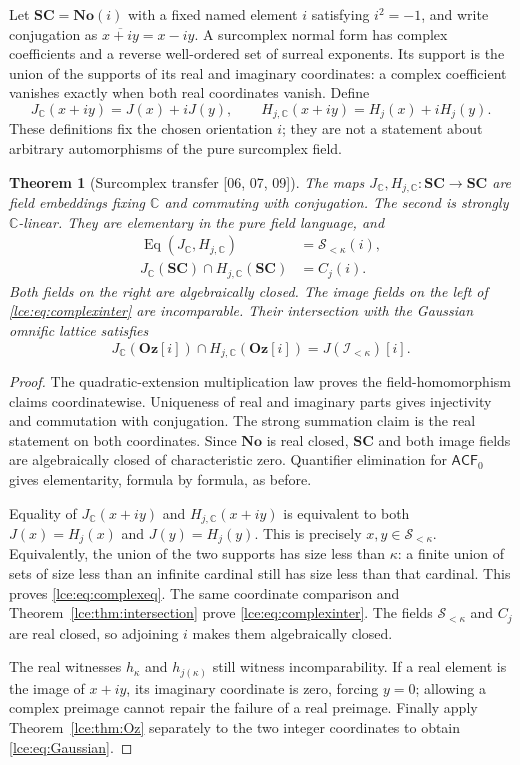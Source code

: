 \documentclass[11pt,letterpaper]{article}
\numberwithin{equation}{section}
\newtheorem{theorem}{Theorem}[section]
\theoremstyle{definition}
\theoremstyle{remark}
\newcommand{\No}{\mathbf{No}}
\newcommand{\Oz}{\mathbf{Oz}}
\newcommand{\SC}{\mathbf{SC}}
\newcommand{\C}{\mathbb C}
\newcommand{\Sk}{\mathscr S_{<\kappa}}
\newcommand{\Ik}{\mathscr I_{<\kappa}}
\newcommand{\Common}{C_j}
\newcommand{\Jc}{J_{\C}}
\newcommand{\Hc}{H_{j,\C}}
\newcommand{\ACF}{\mathsf{ACF}_0}
\newcommand{\thref}[1]{Theorem~\ref{#1}}
\newcommand{\src}[1]{\textup{\textsf{\small[#1]}}}%
\begin{document}
Let $\SC=\No(i)$ with a fixed named element $i$ satisfying $i^2=-1$,
and write conjugation as $\overline{x+iy}=x-iy$.
A surcomplex normal form has complex coefficients and a reverse
well-ordered set of surreal exponents. Its support is the union of the
supports of its real and imaginary coordinates: a complex coefficient
vanishes exactly when both real coordinates vanish.
Define
\[
 \Jc(x+iy)=J(x)+iJ(y),\qquad
 \Hc(x+iy)=H_j(x)+iH_j(y).
\]
These definitions fix the chosen orientation $i$; they are not a statement
about arbitrary automorphisms of the pure surcomplex field.

\begin{theorem}[Surcomplex transfer \src{06, 07, 09}]\label{lce:thm:complex}
The maps $\Jc,\Hc:\SC\to\SC$ are field embeddings fixing $\C$ and
commuting with conjugation. The second is strongly $\C$-linear.
They are elementary in the pure field language, and
\begin{align}
 \operatorname{Eq}(\Jc,\Hc)&=\Sk(i),\label{lce:eq:complexeq}\\
 \Jc(\SC)\cap\Hc(\SC)&=\Common(i).\label{lce:eq:complexinter}
\end{align}
Both fields on the right are algebraically closed. The image fields on
the left of \eqref{lce:eq:complexinter} are incomparable. Their intersection
with the Gaussian omnific lattice satisfies
\begin{equation}\label{lce:eq:Gaussian}
 \Jc(\Oz[i])\cap\Hc(\Oz[i])=J(\Ik)[i].
\end{equation}
\end{theorem}
\begin{proof}
The quadratic-extension multiplication law proves the field-homomorphism
claims coordinatewise. Uniqueness of real and imaginary parts gives
injectivity and commutation with conjugation. The strong summation claim
is the real statement on both coordinates. Since $\No$ is real closed,
$\SC$ and both image fields are algebraically closed of characteristic
zero. Quantifier elimination for $\ACF$ gives elementarity, formula by
formula, as before.

Equality of $\Jc(x+iy)$ and $\Hc(x+iy)$ is equivalent to both
$J(x)=H_j(x)$ and $J(y)=H_j(y)$. This is precisely $x,y\in\Sk$.
Equivalently, the union of the two supports has size less than $\kappa$:
a finite union of sets of size less than an infinite cardinal still has
size less than that cardinal. This proves \eqref{lce:eq:complexeq}.
The same coordinate comparison and \thref{lce:thm:intersection} prove
\eqref{lce:eq:complexinter}. The fields $\Sk$ and $\Common$ are real closed,
so adjoining $i$ makes them algebraically closed.

The real witnesses $h_\kappa$ and $h_{j(\kappa)}$ still witness
incomparability. If a real element is the image of $x+iy$, its imaginary
coordinate is zero, forcing $y=0$; allowing a complex preimage cannot
repair the failure of a real preimage. Finally apply
\thref{lce:thm:Oz} separately to the two integer coordinates to obtain
\eqref{lce:eq:Gaussian}.
\end{proof}
\end{document}
